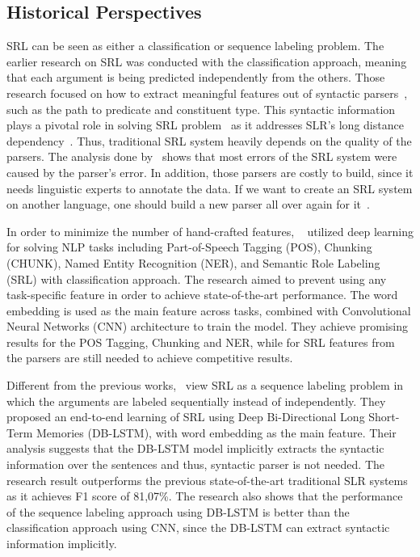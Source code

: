 \subsection{Historical Perspectives}
SRL can be seen as either a classification or sequence labeling problem. The earlier research on SRL was conducted with the classification approach, meaning that each argument is being predicted independently from the others. Those research focused on how to extract meaningful features out of syntactic parsers~\citep{gildea2002automatic, gildea2002necessity, pradhan2005semantic}, such as the path to predicate and constituent type. This syntactic information plays a pivotal role in solving SRL problem~\citep{punyakanok2008importance} as it addresses SLR's long distance dependency~\citep{zhou2015end}. Thus, traditional SRL system heavily depends on the quality of the parsers. The analysis done by~\cite{pradhan2005semantic} shows that most errors of the SRL system were caused by the parser's error. In addition, those parsers are costly to build, since it needs linguistic experts to annotate the data. If we want to create an SRL system on another language, one should build a new parser all over again for it~\citep{zhou2015end}.

In order to minimize the number of hand-crafted features, ~\cite{collobert2011natural} utilized deep learning for solving NLP tasks including Part-of-Speech Tagging (POS), Chunking (CHUNK), Named Entity Recognition (NER), and Semantic Role Labeling (SRL) with classification approach. The research aimed to prevent using any task-specific feature in order to achieve state-of-the-art performance. The word embedding is used as the main feature across tasks, combined with Convolutional Neural Networks (CNN) architecture to train the model. They achieve promising results for the POS Tagging, Chunking and NER, while for SRL features from the parsers are still needed to achieve competitive results.

Different from the previous works,~\cite{zhou2015end} view SRL as a sequence labeling problem in which the arguments are labeled sequentially instead of independently. They proposed an end-to-end learning of SRL using Deep Bi-Directional Long Short-Term Memories (DB-LSTM), with word embedding as the main feature. Their analysis suggests that the DB-LSTM model implicitly extracts the syntactic information over the sentences and thus, syntactic parser is not needed. The research result outperforms the previous state-of-the-art traditional SLR systems as it achieves F1 score of 81,07\%. The research also shows that the performance of the sequence labeling approach using DB-LSTM is better than the classification approach using CNN, since the DB-LSTM can extract syntactic information implicitly.

